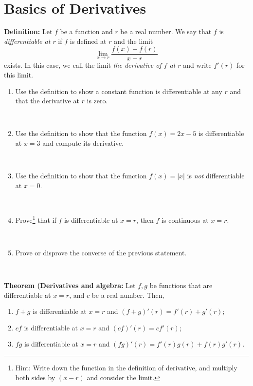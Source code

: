 \documentclass[12pt]{amsart}
\begin{document}
	
	\thispagestyle{empty}
	
	\section*{Basics of Derivatives}
	
\begin{framed} 
\noindent \textbf{Definition:} Let $f$ be a function and $r$ be a real number. We say that $f$ is \emph{differentiable at $r$} if $f$ is defined at $r$ and the limit
\[ \lim_{x\to r} \frac{ f(x) - f(r) }{x-r}\]
exists. In this case, we call the limit \emph{the derivative of $f$ at $r$} and write $f'(r)$ for this limit. 
 \end{framed}
 
 
 \begin{enumerate}
 \item Use the definition to show a constant function is differentiable at any $r$ and that the derivative at $r$ is zero.
 
 \
 
 \item Use the definition to show that the function $f(x) = 2x-5$ is differentiable at $x=3$ and compute its derivative. 
 
 \
 
 \item Use the definition to show that the function $f(x)=|x|$ is \emph{not} differentiable at $x=0$.
 
 \
 
 \item Prove\footnote{Hint: Write down the function in the definition of derivative, and multiply both sides by $(x-r)$ and consider the limit.} that if $f$ is differentiable at $x=r$, then $f$ is continuous at $x=r$. 
 
 \
 
 \item Prove or disprove the converse of the previous statement.
 \end{enumerate}
 
 \
 
 
 \begin{framed} 
 \noindent \textbf{Theorem (Derivatives and algebra:} Let $f,g$ be functions that are differentiable at $x=r$, and $c$ be a real number. Then,
 \begin{enumerate}
 \item $f+g$ is differentiable at $x=r$ and $(f+g)'(r) = f'(r) + g'(r)$;
 \item $cf$ is differentiable at $x=r$ and $(cf)'(r) = c f'(r)$;
 \item $fg$ is differentiable at $x=r$ and $(fg)'(r) = f'(r) g(r) + f(r) g'(r)$.
   \end{enumerate}
 \end{framed}
 
\end{document}
